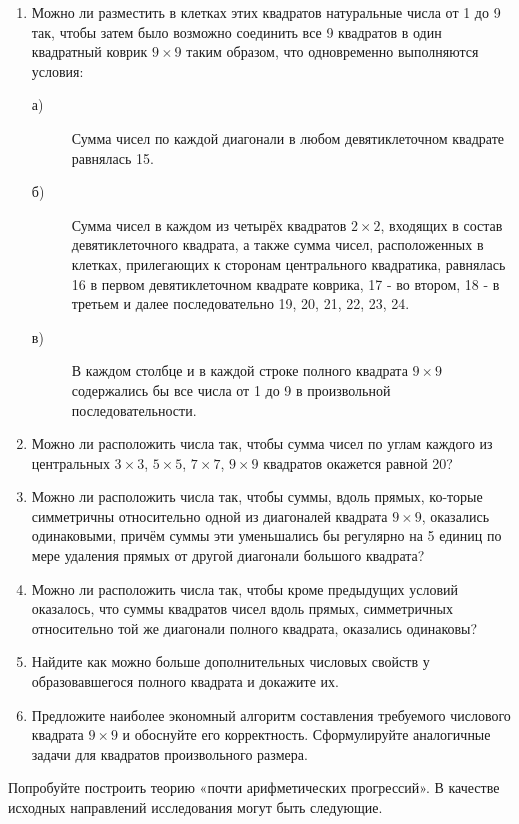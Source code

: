 \begin{enumerate}
\item Можно ли разместить в клетках этих квадратов натуральные числа от 1 до 9 так, чтобы затем было возможно соединить все 9 квадратов в один квадратный коврик  $9\times9$ таким образом, что одновременно выполняются условия:
     \begin{description}
      \item [а) ]Сумма чисел по каждой диагонали в любом девятиклеточном квадрате равнялась 15.
      \item [б) ]Сумма чисел в каждом из четырёх квадратов $2\times2$, входящих в состав девятиклеточного квадрата, а также сумма чисел, расположенных в клетках,         прилегающих к сторонам центрального квадратика, равнялась 16 в первом девятиклеточном квадрате коврика, 17 - во втором, 18 - в третьем и далее последовательно 19, 20, 21, 22, 23, 24.
      \item [в) ]В каждом столбце и в каждой строке полного квадрата $9\times9$ содержались бы все числа от 1 до 9 в произвольной последовательности.
    \end{description}
    
\item Можно ли расположить числа так, чтобы сумма чисел по углам каждого из центральных $3\times3$, $5\times5$, $7\times7$, $9\times9$ квадратов окажется равной 20?
\item Можно ли расположить числа так, чтобы суммы, вдоль прямых, ко-\linebreak торые симметричны относительно одной из диагоналей квадрата $9\times9$, оказались одинаковыми, причём суммы эти уменьшались бы регулярно на 5 единиц по мере удаления прямых от другой диагонали большого квадрата?
\item Можно ли расположить числа так, чтобы кроме предыдущих условий оказалось, что суммы квадратов чисел вдоль прямых, симметричных относительно той же диагонали полного квадрата, оказались одинаковы?
\item Найдите как можно больше дополнительных числовых свойств у образовавшегося полного квадрата и докажите их.
\item Предложите наиболее экономный алгоритм составления требуемого числового квадрата $9\times 9$ и обоснуйте его корректность. Сформулируйте аналогичные задачи для квадратов произвольного размера.
\end{enumerate}


Попробуйте построить теорию «почти арифметических прогрессий». В качестве исходных направлений исследования могут быть следующие.

